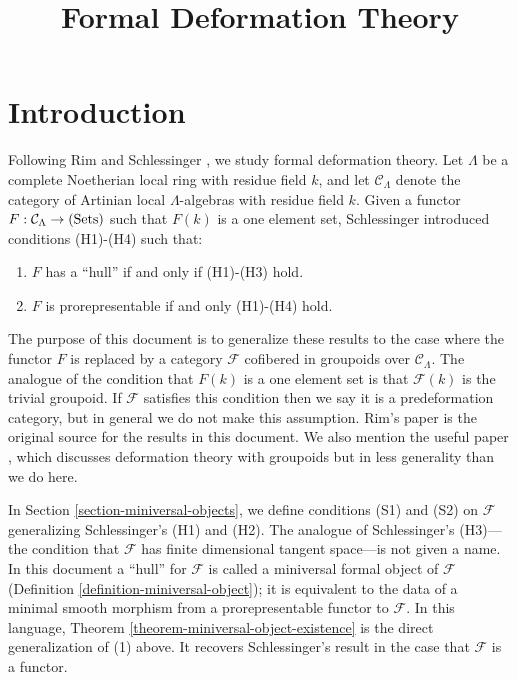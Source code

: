 


%


\title{Formal Deformation Theory}


\maketitle

\label{section-phantom}

\tableofcontents



\section{Introduction}
\label{section-introduction}

\noindent
Following Rim \cite[Exposee VI]{SGA7-I} and Schlessinger \cite{Sch}, we 
study formal deformation theory.  Let $\Lambda$ be a complete Noetherian local 
ring with residue field $k$, and let $\mathcal C_{\Lambda}$ denote the category 
of Artinian local $\Lambda$-algebras with residue field $k$.  Given a functor 
$F: \mathcal C_{\Lambda} \rightarrow \textnormal{(Sets)}$ such that $F(k)$ is a 
one element set, Schlessinger \cite{Sch} introduced conditions 
(H1)-(H4) such that: 
\begin{enumerate}
\item $F$ has a ``hull'' if and only if (H1)-(H3) hold.
\item $F$ is prorepresentable if and only (H1)-(H4) hold.
\end{enumerate} 
The purpose of this document is to generalize these results to the case where 
the functor $F$ is replaced by a category $\mathcal F$ cofibered in groupoids 
over $\mathcal C_{\Lambda}$.  The analogue of the condition that $F(k)$ is a 
one element set is that $\mathcal F(k)$ is the trivial groupoid.  If $\mathcal 
F$ satisfies this condition then we say it is a predeformation category, but in 
general we do not make this assumption.  Rim's paper
\cite[Exposee VI]{SGA7-I} is the original 
source for the results in this document.  We also mention the useful paper 
\cite{Vistoli}, which discusses deformation theory with groupoids but in less 
generality than we do here.
  
\medskip \noindent
In Section \ref{section-miniversal-objects}, we define conditions (S1) and (S2) 
on $\mathcal F$ generalizing Schlessinger's (H1) and (H2).  The analogue of 
Schlessinger's (H3)---the condition that $\mathcal F$ has finite dimensional 
tangent space---is not given a name.  In this document a ``hull'' for $\mathcal 
F$ is called a miniversal formal object of $\mathcal F$ (Definition 
\ref{definition-miniversal-object}); it is equivalent to the data of a minimal 
smooth morphism from a prorepresentable functor to $\mathcal F$.  In this 
language, Theorem \ref{theorem-miniversal-object-existence} is the direct 
generalization of (1) above. It recovers Schlessinger's result in the case that 
$\mathcal F$ is a functor.

